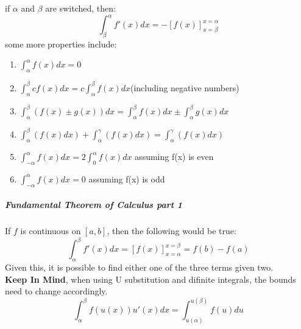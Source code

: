 \documentclass{article} %
\theoremstyle{theorem}
\theoremstyle{definition}
\begin{document}
                    if $\alpha$ and $\beta$ are switched, then:
                    $$\int_{\beta}^{\alpha}f'(x) dx = -[f(x)]^{x=\alpha}_{x=\beta}$$
                    some more properties include:
                    \begin{enumerate}
                        \item $\int ^{\alpha}_{\alpha}f(x)dx = 0$
                        \item $\int _{\alpha}^{\beta}cf(x)dx =c\int _{\alpha}^{\beta}f(x)dx$(including negative numbers)
                        \item $\int _{\alpha}^{\beta}(f(x)\pm g(x))dx = \int _{\alpha}^{\beta}f(x)dx\pm \int _{\alpha}^{\beta} g(x)dx$
                        \item $\int _{\alpha}^{\beta}(f(x)dx)+\int ^{\gamma}_{\alpha}(f(x)dx)=\int ^{\gamma}_{\alpha}(f(x)dx)$
                        \item $\int ^{\alpha}_{-\alpha}f(x)dx=2\int ^{\alpha}_{0}f(x)dx$ assuming f(x) is even
                        \item $\int ^{\alpha}_{-\alpha}f(x)dx=0$ assuming f(x) is odd
                    \end{enumerate}
                \subparagraph{Fundamental Theorem of Calculus part 1}
                    If $f$ is continuous on $[a,b]$, then the following would be true:
                    \begin{equation}
                        \int^\beta_\alpha f'(x)dx = [f(x)]^{x=\beta}_{x=\alpha}=f(b)-f(a)
                    \end{equation}
                    Given this, it is possible to find either one of the three terms given two. 
                    \\\textbf{Keep In Mind}, when using U substitution and difinite integrals, the bounds need to change accordingly.
                    \begin{equation}
                        \int^\beta_\alpha f(u(x))u'(x)dx = \int^{u(\beta)}_{u(\alpha)}f(u)du
                    \end{equation}
\end{document}
